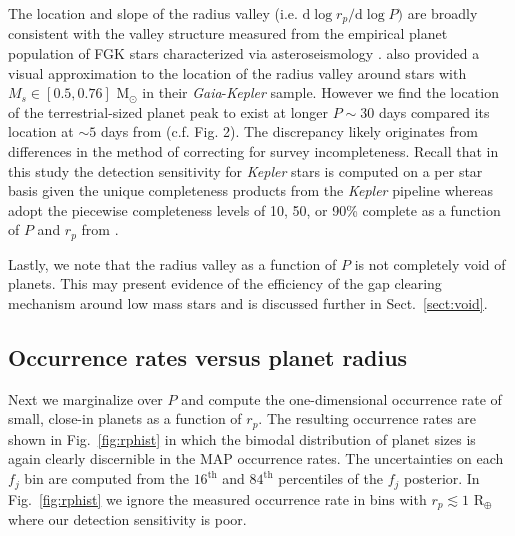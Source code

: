 \documentclass[twocolumn]{emulateapj}
\newcommand{\gaia}[1]{\emph{Gaia}#1}
\newcommand{\kepler}[1]{\emph{Kepler}#1}
\begin{document}
The location and slope of the radius valley (i.e. $\text{d}\log{r_p}/\text{d}\log{P})$ are broadly consistent
with the valley structure measured from the empirical planet population of FGK stars characterized via
asteroseismology \citep{vaneylen18}. \cite{wu19} also provided a visual approximation to the location of the
radius valley around stars with $M_s \in [0.5,0.76]$ M$_{\odot}$ in their \gaia{-}\kepler{} sample. However
we find the location of the terrestrial-sized planet peak to exist at longer $P \sim 30$ days compared its
location at $\sim 5$ days from \cite{wu19} (c.f. Fig. 2). The discrepancy likely originates from differences
in the method of correcting for survey incompleteness.
Recall that in this study the detection sensitivity for \kepler{} stars is computed on a per star basis
given the unique completeness products from the \kepler{} pipeline whereas \cite{wu19} adopt the piecewise
completeness levels of 10, 50, or 90\% complete as a function of $P$ and $r_p$ from \cite{zhu18b}.

Lastly, we note that the radius valley as a function of $P$ is not completely void of planets.
This may present evidence of the efficiency of the gap clearing mechanism around low mass stars and is
discussed further in Sect.~\ref{sect:void}.

\subsection{Occurrence rates versus planet radius}
Next we marginalize over $P$ and compute the one-dimensional occurrence rate of small, close-in planets
as a function of $r_p$. The resulting occurrence rates are shown in Fig.~\ref{fig:rphist} in which the bimodal
distribution of planet sizes is again clearly discernible in the MAP occurrence rates.
The uncertainties on each $f_j$ bin are computed from the $16^{\text{th}}$ and $84^{\text{th}}$ percentiles
of the $f_j$ posterior. In Fig.~\ref{fig:rphist} we ignore the measured occurrence rate in bins with
$r_p\lesssim 1$ R$_{\oplus}$ where our detection sensitivity is poor.
\end{document}
